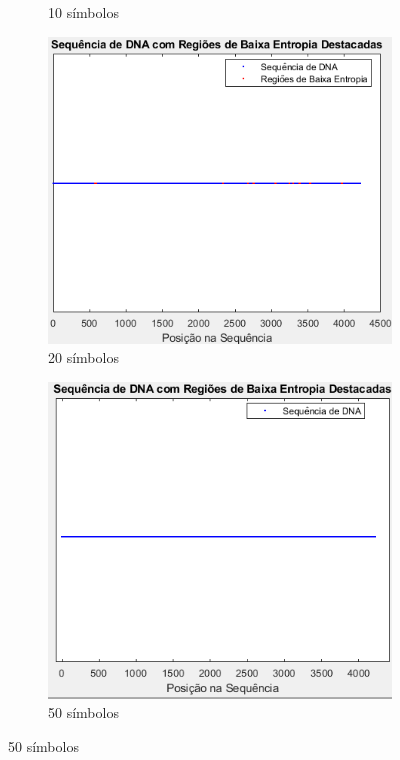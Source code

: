 \documentclass{article}
\begin{document}
\begin{figure}[h]
\begin{subfigure}{0.20\textwidth}
    \caption{10 símbolos}
  \end{subfigure}\hspace{1em}
  \begin{subfigure}{0.20\textwidth}
    \centering
    \includegraphics[width=\linewidth]{Janela20.png}
    \caption{20 símbolos}
  \end{subfigure}\hspace{1em}
  \begin{subfigure}{0.20\textwidth}
    \centering
    \includegraphics[width=\linewidth]{Janela50.png}
    \caption{50 símbolos}
  \end{subfigure}
  \end{figure}
\end{document}
